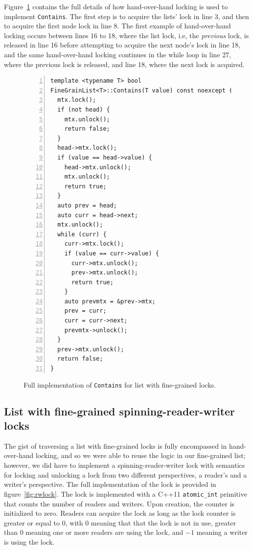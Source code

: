 \documentclass[11pt]{article}
\begin{document}
Figure~\ref{fig:finegrain} contains the full details of how hand-over-hand
locking is used to implement {\tt Contains}. The first step is to acquire the
lists' lock in line 3, and then to acquire the first node lock in line 8. The
first example of hand-over-hand locking occurs between lines 16 to 18, where the
list lock, i.e, the {\it previous} lock, is released in line 16 before
attempting to acquire the next node's lock in line 18, and the same
hand-over-hand locking continues in the while loop in line 27, where the
previous lock is released, and line 18, where the next lock is acquired.

\begin{figure}
\begin{center}
\begin{lstlisting}[numbers=left]
template <typename T> bool
FineGrainList<T>::Contains(T value) const noexcept {
  mtx.lock();
  if (not head) {
    mtx.unlock();
    return false;
  }
  head->mtx.lock();
  if (value == head->value) {
    head->mtx.unlock();
    mtx.unlock();
    return true;
  }
  auto prev = head;
  auto curr = head->next;
  mtx.unlock();
  while (curr) {
    curr->mtx.lock();
    if (value == curr->value) {
      curr->mtx.unlock();
      prev->mtx.unlock();
      return true;
    }
    auto prevmtx = &prev->mtx;
    prev = curr;
    curr = curr->next;
    prevmtx->unlock();
  }
  prev->mtx.unlock();
  return false;
}
\end{lstlisting}
\caption{
Full implementation of {\tt Contains} for list with fine-grained locks.}
\label{fig:finegrain}
\end{center}
\end{figure}

\subsection{List with fine-grained spinning-reader-writer locks}
The gist of traversing a list with fine-grained locks is fully encompassed in
hand-over-hand locking, and so we were able to reuse the logic in our
fine-grained list; however, we did have to implement a spinning-reader-writer
lock with semantics for locking and unlocking a lock from two different
perspectives, a reader's and a writer's perspective. The full implementation of
the lock is provided in figure~\ref{fig:rwlock}. The lock is implemented with a
C++11 {\tt atomic\_int} primitive that counts the number of readers and writers.
Upon creation, the counter is initialized to zero. Readers can acquire the lock
as long as the lock counter is greater or equal to $0$, with $0$ meaning that
that the lock is not in use, greater than $0$ meaning one or more readers are
using the lock, and $-1$ meaning a writer is using the lock.
\end{document}
